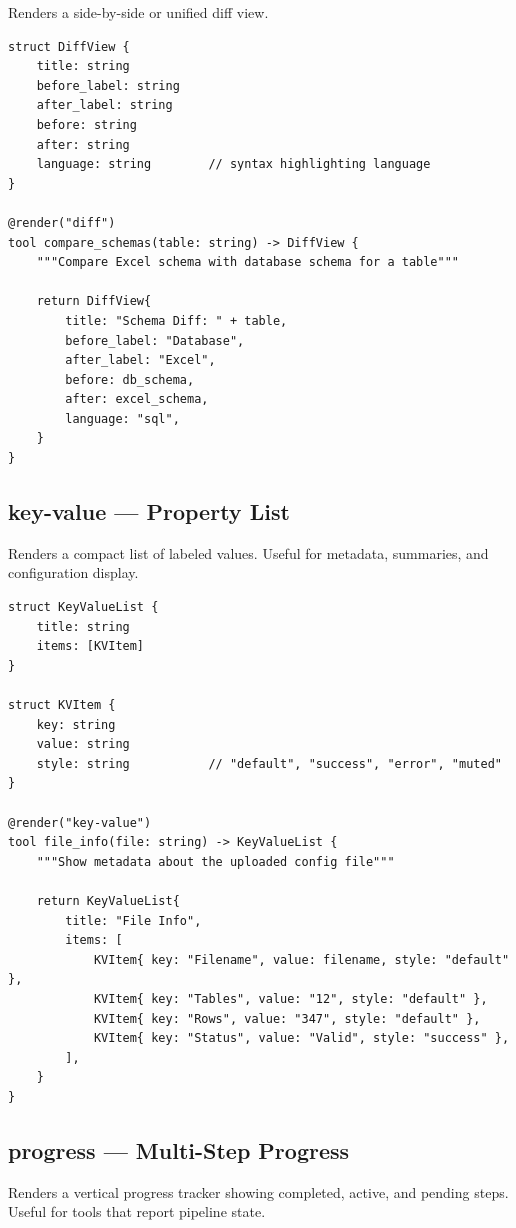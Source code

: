 Renders a side-by-side or unified diff view.

\begin{lstlisting}
struct DiffView {
    title: string
    before_label: string
    after_label: string
    before: string
    after: string
    language: string        // syntax highlighting language
}

@render("diff")
tool compare_schemas(table: string) -> DiffView {
    """Compare Excel schema with database schema for a table"""

    return DiffView{
        title: "Schema Diff: " + table,
        before_label: "Database",
        after_label: "Excel",
        before: db_schema,
        after: excel_schema,
        language: "sql",
    }
}
\end{lstlisting}

\subsection{key-value --- Property List}

Renders a compact list of labeled values. Useful for metadata, summaries, and configuration display.

\begin{lstlisting}
struct KeyValueList {
    title: string
    items: [KVItem]
}

struct KVItem {
    key: string
    value: string
    style: string           // "default", "success", "error", "muted"
}

@render("key-value")
tool file_info(file: string) -> KeyValueList {
    """Show metadata about the uploaded config file"""

    return KeyValueList{
        title: "File Info",
        items: [
            KVItem{ key: "Filename", value: filename, style: "default" },
            KVItem{ key: "Tables", value: "12", style: "default" },
            KVItem{ key: "Rows", value: "347", style: "default" },
            KVItem{ key: "Status", value: "Valid", style: "success" },
        ],
    }
}
\end{lstlisting}

\subsection{progress --- Multi-Step Progress}

Renders a vertical progress tracker showing completed, active, and pending steps. Useful for tools that report pipeline state.

